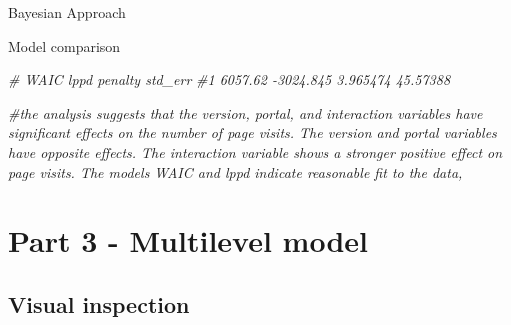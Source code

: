 \documentclass[
  ignorenonframetext,
]{beamer}
\newenvironment{Shaded}{\begin{snugshade}}{\end{snugshade}}
\newcommand{\CommentTok}[1]{\textcolor[rgb]{0.56,0.35,0.01}{\textit{#1}}}
\begin{document}
\begin{frame}[fragile]{Bayesian Approach}
\begin{block}{Model comparison}
\begin{Shaded}
\begin{Highlighting}[]
\CommentTok{\#     WAIC      lppd  penalty  std\_err}
\CommentTok{\#1 6057.62 {-}3024.845 3.965474 45.57388}

\CommentTok{\#the analysis suggests that the version, portal, and interaction variables have significant effects on the number of page visits. The version and portal variables have opposite effects. The interaction variable shows a stronger positive effect on page visits. The model\textquotesingle{}s WAIC and lppd indicate reasonable fit to the data, }
\end{Highlighting}
\end{Shaded}
\end{block}
\end{frame}

\hypertarget{part-3---multilevel-model}{%
\section{Part 3 - Multilevel model}\label{part-3---multilevel-model}}

\hypertarget{visual-inspection-1}{%
\subsection{Visual inspection}\label{visual-inspection-1}}
\end{document}
